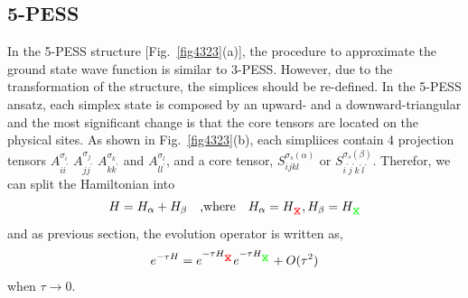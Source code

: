 \subsection{5-PESS}
In the 5-PESS structure [Fig.~\ref{fig4323}(a)], the procedure to approximate the ground state wave function is similar to 3-PESS. However, due to the transformation of the structure, the simplices should be re-defined. In the 5-PESS ansatz, each simplex state is composed by an upward- and a downward-triangular and the most significant change is that the core tensors are located on the physical sites. As shown in Fig.~\ref{fig4323}(b), each simpliices contain 4 projection tensors $A^{\sigma_i}_{ii^{\prime}}$ $A^{\sigma_j}_{jj^{\prime}}$ $A^{\sigma_k}_{kk^{\prime}}$ and $A^{\sigma_l}_{ll^{\prime}}$, and a core tensor, $S^{\sigma_s (\alpha)}_{ijkl}$ or $S^{\sigma_s (\beta)}_{i^{\prime}j^{\prime}k^{\prime}l^{\prime}}$. Therefor, we can split the Hamiltonian into 
\begin{align}
	H = H_{\alpha} + H_{\beta} \quad \text{,where} \quad H_{\alpha} = H_{\rjoinr}, H_{\beta} = H_{\rjoing}
\end{align}
and as previous section, the evolution operator is written as, 
\begin{align}
	e^{-\tau H} = e^{-\tau H_{\rjoinr}} e^{-\tau H_{\rjoing}} + O(\tau^2)
\end{align}
when $\tau \rightarrow 0$.

